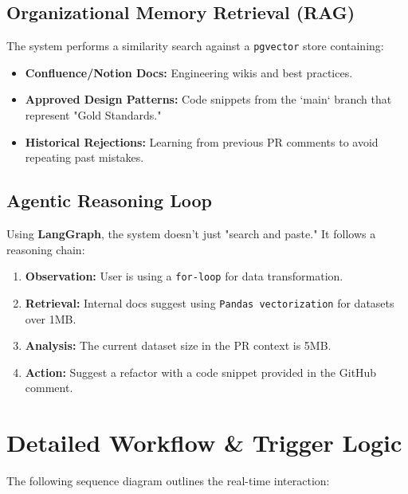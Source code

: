 \documentclass[11pt]{article}
\begin{document}
\subsection{Organizational Memory Retrieval (RAG)}
The system performs a similarity search against a \texttt{pgvector} store containing:
\begin{itemize}
    \item \textbf{Confluence/Notion Docs:} Engineering wikis and best practices.
    \item \textbf{Approved Design Patterns:} Code snippets from the `main` branch that represent "Gold Standards."
    \item \textbf{Historical Rejections:} Learning from previous PR comments to avoid repeating past mistakes.
\end{itemize}

\subsection{Agentic Reasoning Loop}
Using \textbf{LangGraph}, the system doesn't just "search and paste." It follows a reasoning chain:
\begin{enumerate}
    \item \textbf{Observation:} User is using a \texttt{for-loop} for data transformation.
    \item \textbf{Retrieval:} Internal docs suggest using \texttt{Pandas vectorization} for datasets over 1MB.
    \item \textbf{Analysis:} The current dataset size in the PR context is 5MB.
    \item \textbf{Action:} Suggest a refactor with a code snippet provided in the GitHub comment.
\end{enumerate}

\section{Detailed Workflow \& Trigger Logic}
The following sequence diagram outlines the real-time interaction:
\end{document}
